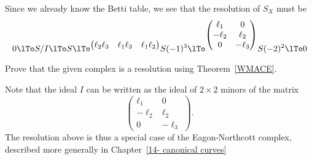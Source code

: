 \begin{example}
 Since we already know the Betti table, we see that the resolution
 of $S_{X}$ must be
$$
0\lTo S/I\lTo S
\lTo^{\begin{pmatrix}
\ell_2\ell_3&\ell_1\ell_3&\ell_1\ell_2
\end{pmatrix}}
 S(-1)^3
 \lTo^{\begin{pmatrix}
  \ell_1&0\\
  -\ell_2&\ell_2\\
 0&-\ell_3
 \end{pmatrix}}
 S(-2)^2
 \lTo 0
$$
\begin{exercise}
Prove that the given complex is a resolution using Theorem~\ref{WMACE}.
\end{exercise}
 
Note that the
ideal $I$ can be written as the ideal of $2\times 2$ minors of the matrix
$$
 {\begin{pmatrix}
  \ell_1&0\\
  -\ell_2&\ell_2\\
 0&-\ell_3
 \end{pmatrix}}.
$$
The resolution above is thus a special case of the Eagon-Northcott complex, described more generally in Chapter~\ref{14- canonical curves}
\end{example}

